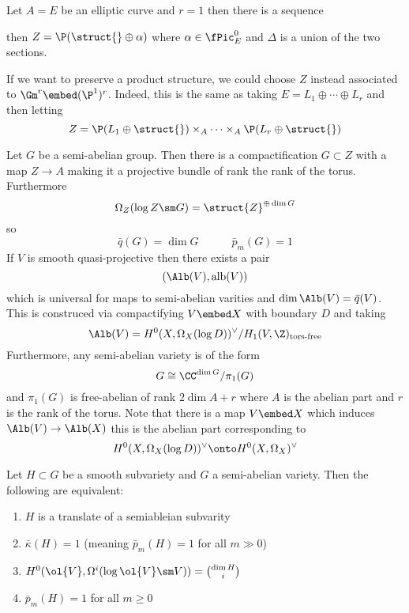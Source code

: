 \documentclass[12pt]{article}
\theoremstyle{plain}
\begin{document}
\begin{example}
Let $A = E$ be an elliptic curve and $r = 1$ then there is a sequence
\begin{center}
\end{center}
then $Z = \P(\struct{} \oplus \alpha)$ where $\alpha \in \fPic^0_E$ and $\Delta$ is a union of the two sections.
\end{example}

\begin{rmk}
If we want to preserve a product structure, we could choose $Z$ instead associated to $\Gm^r \embed (\P^1)^r$. Indeed, this is the same as taking $E = L_1 \oplus \cdots \oplus L_r$ and then letting
\[ Z = \P(L_1 \oplus \struct{}) \times_A \cdots \times_A \P(L_r \oplus \struct{}) \]
\end{rmk}


Let $G$ be a semi-abelian group. Then there is a compactification $G \subset Z$ with a map $Z \to A$ making it a projective bundle of rank the rank of the torus. Furthermore
\[ \Omega_Z(\log{Z \sm G}) = \struct{Z}^{\oplus \dim{G}} \]
so 
\[ \bar{q}(G) = \dim{G} \quad \quad \quad \bar{p}_m(G) = 1 \]
If $V$ is smooth quasi-projective then there exists a pair
\[ (\Alb(V), \alb(V)) \]
which is universal for maps to semi-abelian varities and $\dim{\Alb(V)} = \bar{q}(V)$. This is construced via compactifying $V \embed X$ with boundary $D$ and taking
\[ \Alb(V) = H^0(X, \Omega_X(\log{D}))^\vee / H_1(V, \Z)_{\text{tors-free}} \]
Furthermore, any semi-abelian variety is of the form
\[ G \cong \CC^{\dim{G}} / \pi_1(G) \]
and $\pi_1(G)$ is free-abelian of rank $2 \dim{A} + r$ where $A$ is the abelian part and $r$ is the rank of the torus. Note that there is a map $V \embed X$ which induces $\Alb(V) \to \Alb(X)$ this is the abelian part corresponding to
\[ H^0(X, \Omega_X(\log{D}))^\vee \onto H^0(X, \Omega_X)^\vee \]

\begin{prop}
Let $H \subset G$ be a smooth subvariety and $G$ a semi-abelian variety. Then the following are equivalent:
\begin{enumerate}
\item $H$ is a translate of a semiableian subvarity
\item $\bar{\kappa}(H) = 1$ (meaning $\bar{p}_m(H) = 1$ for all $m \gg 0$)
\item $H^0(\ol{V}, \Omega^i(\log{\ol{V} \sm V})) = { \dim{H} \choose i }$
\item $\bar{p}_m(H) = 1$ for all $m \ge 0$
\end{enumerate}
\end{prop}
\end{document}
